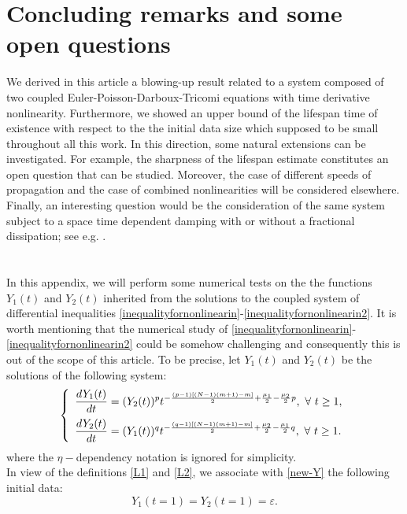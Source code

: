 \documentclass[12pt,leqno]{amsart}
\numberwithin{equation}{section}
\theoremstyle{remark}
\def\d{\displaystyle}
\begin{document}
\section{Concluding remarks and some open questions}\label{open}
We derived in this article a blowing-up result related to a system composed of two coupled Euler-Poisson-Darboux-Tricomi equations with time derivative nonlinearity. Furthermore, we showed an upper bound of the lifespan time of existence with respect to the the initial data size which supposed to be small throughout all this work. In this direction, some natural extensions can be investigated. For example, the sharpness of the lifespan estimate constitutes an open question that can be studied. Moreover, the case of different speeds of propagation and the case of combined nonlinearities will be considered elsewhere. Finally, an interesting question  would be the consideration of the same system subject to a space time dependent damping with or without a fractional dissipation; see e.g. \cite{Kirane1, Kirane2}.





\appendix \section{} \label{appendix1}

In this appendix, we will perform some numerical tests on the the functions $Y_1(t)$ and $Y_2(t)$ inherited from the solutions to the coupled system of differential inequalities \eqref{inequalityfornonlinearin}-\eqref{inequalityfornonlinearin2}. It is worth mentioning that the numerical study of \eqref{inequalityfornonlinearin}-\eqref{inequalityfornonlinearin2} could be somehow challenging and consequently this is out of the scope of this article. To be precise,  let $Y_1(t)$ and $Y_2(t)$ be the solutions of the following system:
\begin{equation}\label{new-Y}
\left\{\begin{array}{l}
\d \frac{d Y_1(t)}{dt} = (Y_2(t))^p  t^{-\frac{(p-1)[(N-1)(m+1)-m]}{2}+ \frac{\mu_1}{2}-\frac{\mu_2}{2}p}, \ \forall \ t \ge 1,\vspace{.2cm}\\
\d \frac{d Y_2(t)}{dt} = (Y_1(t))^q  t^{-\frac{(q-1)[(N-1)(m+1)-m]}{2}+ \frac{\mu_2}{2}-\frac{\mu_1}{2}q}, \ \forall \ t \ge 1.
\end{array}
\right.
\end{equation}
where the $\eta-$dependency notation is ignored for simplicity.\\
In view of the definitions \eqref{L1} and  \eqref{L2}, we associate with \eqref{new-Y} the following initial data:
\begin{equation}\label{new-Y-IC}
Y_1(t=1)=Y_2(t=1)= \varepsilon.
\end{equation}
\end{document}

